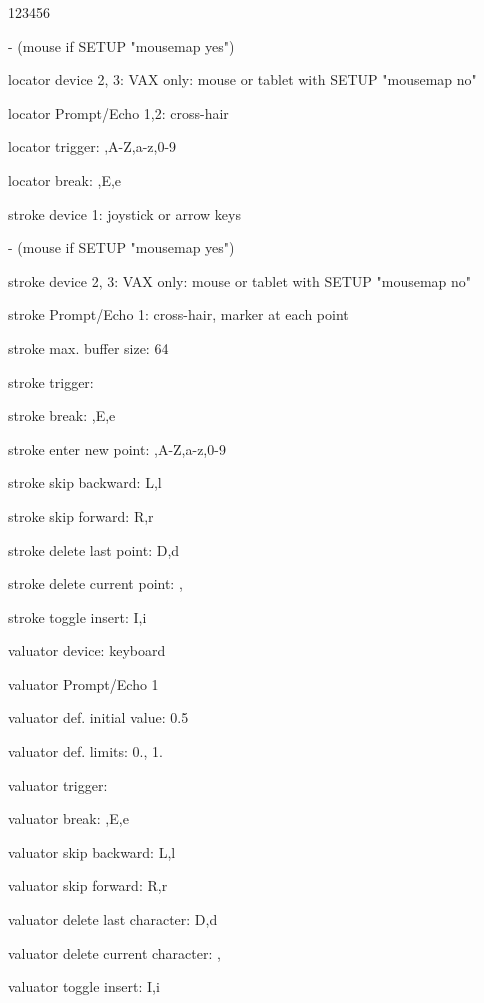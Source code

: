 \begin{DLtt}{123456}
\item[-](mouse if SETUP "mousemap yes")
\item[locator device 2, 3:]VAX only: mouse or tablet with SETUP "mousemap no"
\item[locator Prompt/Echo 1,2:]cross-hair
\item[locator trigger:],A-Z,a-z,0-9
\item[locator break:],E,e
\item[stroke device 1:]joystick or arrow keys
\item[-](mouse if SETUP "mousemap yes")
\item[stroke device 2, 3:]VAX only: mouse or tablet with SETUP "mousemap no"
\item[stroke Prompt/Echo 1:]cross-hair, marker at each point
\item[stroke max. buffer size:]64
\item[stroke trigger:]
\item[stroke break:],E,e
\item[stroke enter new point:],A-Z,a-z,0-9
\item[stroke skip backward:]L,l
\item[stroke skip forward:]R,r
\item[stroke delete last point:]D,d
\item[stroke delete current point:], 
\item[stroke toggle insert:]I,i
\item[valuator device:]keyboard
\item[valuator Prompt/Echo 1]
\item[valuator def. initial value:]0.5
\item[valuator def. limits:]0., 1.
\item[valuator trigger:]
\item[valuator break:],E,e
\item[valuator skip backward:]L,l
\item[valuator skip forward:]R,r
\item[valuator delete last character:]D,d
\item[valuator delete current character:], 
\item[valuator toggle insert:]I,i

\end{DLtt}

